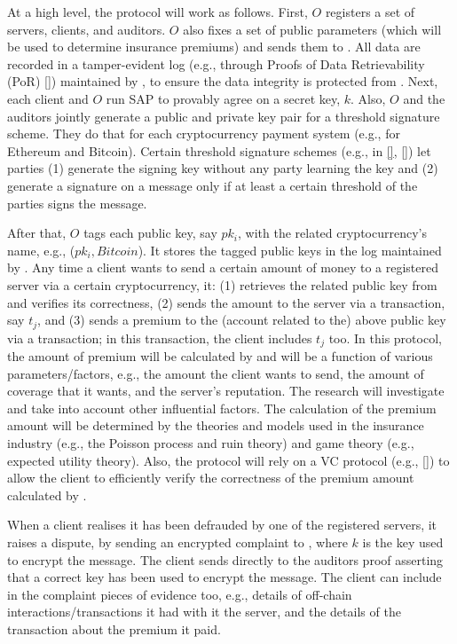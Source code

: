 At a high level, the protocol will work as follows. First, $O$ registers a set of servers,  clients, and auditors. $O$ also fixes a set of public parameters (which will be used to determine insurance premiums) and sends them to \cs. All data are recorded in a tamper-evident log (e.g., through Proofs of Data Retrievability (PoR) \href{https://link.springer.com/chapter/10.1007/978-3-540-89255-7_7}{[\printcntr]}) maintained by \cs, to ensure the data integrity is protected from \cs. 
%
Next, each client and $O$ run SAP to provably agree on a secret key, $k$. Also, $O$ and the auditors jointly generate a public and private key pair for a threshold signature scheme. They do that for each cryptocurrency payment system (e.g., for Ethereum and Bitcoin). Certain threshold signature schemes (e.g.,  in \href{https://link.springer.com/chapter/10.1007/3-540-44987-6_10}{[\printcntr]}, \href{https://link.springer.com/chapter/10.1007/978-3-319-39555-5_9}{[\printcntr]}) let parties (1) generate the signing key without any party learning the key and (2) generate a signature on a message only if at least a certain threshold of the parties signs the message. 

After that, $O$ tags each public key, say $pk_i$, with the related cryptocurrency's name, e.g., ($pk_{i}, Bitcoin$). It stores the tagged public keys in the log maintained by \cs. 
% 
 Any time a client wants to send a certain amount of money to a registered server via a certain cryptocurrency, it: (1) retrieves the related public key from \cs and verifies its correctness, (2) sends the amount to the server via a transaction, say $t_j$, and (3) sends a premium to the (account related to the) above public key via a transaction; in this transaction, the client includes $t_j$ too. In this protocol, the amount of premium will be calculated by \cs and will be a function of various parameters/factors, e.g.,  the amount the client wants to send, the amount of coverage that it wants, and the server's reputation. The research will investigate and take into account other influential factors. The calculation of the premium amount will be determined by the theories and models used in the insurance industry (e.g., the Poisson process and ruin theory) and game theory (e.g., expected utility theory).  Also, the protocol will rely on a VC protocol (e.g., \href{https://link.springer.com/chapter/10.1007/978-3-642-14623-7_25}{[\printcntr]}) to allow the client to efficiently verify the correctness of the premium amount calculated by \cs. 

When a client realises it has been defrauded by one of the registered servers, it raises a dispute, by sending an encrypted complaint to \cs, where $k$ is the key used to encrypt the message. The client sends directly to the auditors proof asserting that a correct key has been used to encrypt the message. The client can include in the complaint pieces of evidence too, e.g., details of off-chain interactions/transactions it had with it the server, and the details of the transaction about the premium it paid. 


